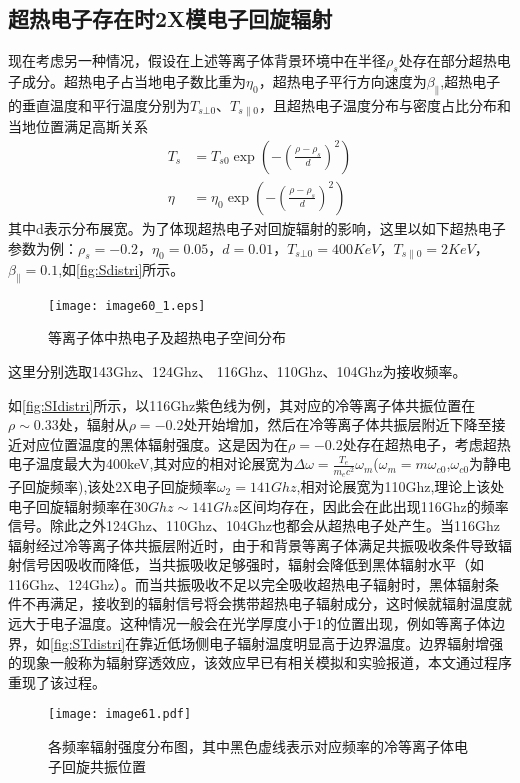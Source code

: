 \subsection{超热电子存在时2X模电子回旋辐射}
现在考虑另一种情况，假设在上述等离子体背景环境中在半径$ρ_s$处存在部分超热电子成分。超热电子占当地电子数比重为$η_0$，超热电子平行方向速度为$\beta_{\parallel}$,超热电子的垂直温度和平行温度分别为$T_{s⊥0}$、$T_{s\|0}$，且超热电子温度分布与密度占比分布和当地位置满足高斯关系
\begin{align}
T_{s } & =T_{s  0} \exp \left(-\left(\frac{\rho-\rho_{s}}{d}\right)^{2}\right) \\
\eta & =\eta_{0} \exp \left(-\left(\frac{\rho-\rho_{s}}{d}\right)^{2}\right)
\end{align}
其中d表示分布展宽。为了体现超热电子对回旋辐射的影响，这里以如下超热电子参数为例：$ρ_s=-0.2$，$η_0=0.05$，$d=0.01$，$T_{s⊥0}=400KeV$，$T_{s∥0}=2KeV$，$β_∥=0.1$,如\autoref{fig:Sdistri}所示。
\begin{figure}[ht]
\centering
\texttt{[image: image60\_1.eps]}
\caption{\label{fig:Sdistri}等离子体中热电子及超热电子空间分布}
\end{figure}
这里分别选取143Ghz、124Ghz、 116Ghz、110Ghz、104Ghz为接收频率。
\par 如\autoref{fig:SIdistri}所示，以116Ghz紫色线为例，其对应的冷等离子体共振位置在$ρ\sim0.33$处，辐射从$ρ=-0.2$处开始增加，然后在冷等离子体共振层附近下降至接近对应位置温度的黑体辐射强度。这是因为在$ρ=-0.2$处存在超热电子，考虑超热电子温度最大为400keV,其对应的相对论展宽为$\Delta\omega=\frac{T_e}{m_ec^2}\omega_{m}$($\omega_{m}=m\omega_{c0}$,$\omega_{c0}$为静电子回旋频率),该处2X电子回旋频率$\omega_{2}=141Ghz$,相对论展宽为110Ghz,理论上该处电子回旋辐射频率在$30Ghz\sim141Ghz$区间均存在，因此会在此出现116Ghz的频率信号。除此之外124Ghz、110Ghz、104Ghz也都会从超热电子处产生。当116Ghz辐射经过冷等离子体共振层附近时，由于和背景等离子体满足共振吸收条件导致辐射信号因吸收而降低，当共振吸收足够强时，辐射会降低到黑体辐射水平（如116Ghz、124Ghz）。而当共振吸收不足以完全吸收超热电子辐射时，黑体辐射条件不再满足，接收到的辐射信号将会携带超热电子辐射成分，这时候就辐射温度就远大于电子温度。这种情况一般会在光学厚度小于1的位置出现，例如等离子体边界，如\autoref{fig:STdistri}在靠近低场侧电子辐射温度明显高于边界温度。边界辐射增强的现象一般称为辐射穿透效应，该效应早已有相关模拟和实验报道\cite{RN2065}，本文通过程序重现了该过程。
\begin{figure}[ht]
\centering
\texttt{[image: image61.pdf]}
\caption{\label{fig:SIdistri}各频率辐射强度分布图，其中黑色虚线表示对应频率的冷等离子体电子回旋共振位置}
\end{figure}

